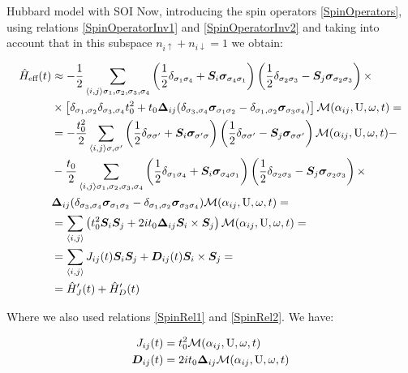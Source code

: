 \begin{section}{Hubbard model with SOI}
Now, introducing the spin operators \ref{SpinOperators}, using relations \ref{SpinOperatorInv1} and \ref{SpinOperatorInv2} and taking into account that in this subspace $n_{i\uparrow}+n_{i\downarrow}=1$ we obtain:

\begin{align*}
\hat{H}_{\text{eff}}(t) &\approx -\frac{1}{2}\sum_{\langle i,j \rangle \sigma_1, \sigma_2, \sigma_3, \sigma_4} \left(\frac{1}{2}\delta_{\sigma_1 \sigma_4} + \boldsymbol{S}_i\boldsymbol{\sigma}_{\sigma_4 \sigma_1}\right)\left(\frac{1}{2}\delta_{\sigma_2 \sigma_3}-\boldsymbol{S}_j\boldsymbol{\sigma}_{\sigma_2 \sigma_3}\right) \times \\
&\times \left[ \delta_{\sigma_1, \sigma_2}\delta_{\sigma_3, \sigma_4}t_0^2+t_0\boldsymbol{\Delta}_{ij}(\delta_{\sigma_3,\sigma_4}\boldsymbol{\sigma}_{\sigma_1 \sigma_2}-\delta_{\sigma_1,\sigma_2}\boldsymbol{\sigma}_{\sigma_3 \sigma_4}) \right]\mathcal{M}(\alpha_{ij}, \text{U}, \omega, t) = \\
&= -\frac{t_0^2}{2} \sum_{\langle i,j \rangle \sigma, \sigma'} \left(\frac{1}{2}\delta_{\sigma \sigma'} + \boldsymbol{S}_i\boldsymbol{\sigma}_{\sigma' \sigma}\right)\left(\frac{1}{2}\delta_{\sigma \sigma'}-\boldsymbol{S}_j\boldsymbol{\sigma}_{\sigma \sigma'}\right)\mathcal{M}(\alpha_{ij}, \text{U}, \omega, t) - \\
&- \frac{t_0}{2} \sum_{\langle i,j \rangle \sigma_1, \sigma_2, \sigma_3, \sigma_4} \left(\frac{1}{2}\delta_{\sigma_1 \sigma_4} + \boldsymbol{S}_i\boldsymbol{\sigma}_{\sigma_4 \sigma_1}\right)\left(\frac{1}{2}\delta_{\sigma_2 \sigma_3}-\boldsymbol{S}_j\boldsymbol{\sigma}_{\sigma_2 \sigma_3}\right) \times \\
&\boldsymbol{\Delta}_{ij}(\delta_{\sigma_3,\sigma_4}\boldsymbol{\sigma}_{\sigma_1 \sigma_2}-\delta_{\sigma_1,\sigma_2}\boldsymbol{\sigma}_{\sigma_3 \sigma_4})\mathcal{M}(\alpha_{ij}, \text{U}, \omega, t) = \\
&= \sum_{\langle i,j \rangle} \left( t_0^2 \boldsymbol{S}_i\boldsymbol{S}_j + 2it_0\boldsymbol{\Delta}_{ij} \boldsymbol{S}_i \times \boldsymbol{S}_j \right) \mathcal{M}(\alpha_{ij}, \text{U}, \omega, t) =\\
&= \sum_{\langle i,j \rangle} J_{ij}(t)\boldsymbol{S}_i\boldsymbol{S}_j +\boldsymbol{D}_{ij}(t)\boldsymbol{S}_i \times \boldsymbol{S}_j = \\
&= \hat{H}_J'(t)+\hat{H}_D'(t)
\end{align*}

Where we also used relations \ref{SpinRel1} and \ref{SpinRel2}. We have:

\begin{align}
J_{ij}(t) &= t_0^2\mathcal{M}(\alpha_{ij}, \text{U}, \omega, t) \label{JijHSOI} \\
\boldsymbol{D}_{ij}(t) &= 2it_0\boldsymbol{\Delta}_{ij} \mathcal{M}(\alpha_{ij}, \text{U}, \omega, t) \label{DijHSOI}
\end{align}


\end{section}
